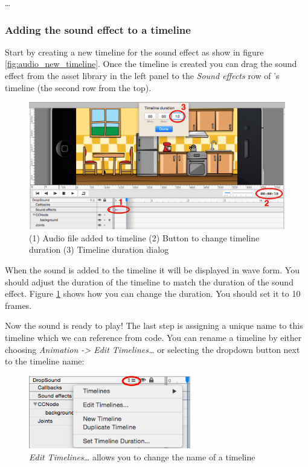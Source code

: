 \ldots


\subsubsection{Adding the sound effect to a timeline}

Start by creating a new timeline for the sound effect as show in figure
\ref{fig:audio_new_timeline}. Once the timeline is created you can drag the
sound effect from the asset library in the left panel to the \textit{Sound
effects} row of \SB{}'s timeline (the second row from the top).

\begin{figure}[H]
		\centering
		\includegraphics[width=0.9\linewidth]{images/Chapter2/audio_timeline.png}
		\caption{(1) Audio file added to timeline\newline{} (2)
		Button to change timeline duration\newline{} (3) Timeline
		duration dialog\newline{}}\label{fig:change_timeline_duration}
\end{figure}

When the sound is added to the timeline it will be displayed in wave form. You
should adjust the duration of the timeline to match the duration of the sound
effect. Figure \ref{fig:change_timeline_duration} shows how you can change the
duration. You should set it to 10 frames.

Now the sound is ready to play! The last step is assigning a unique name to this
timeline which we can reference from code. You can rename a timeline by either
choosing \textit{Animation -> Edit Timelines\ldots} or selecting the dropdown
button next to the timeline name:

\begin{figure}[H]
		\centering
		\includegraphics[width=200pt]{images/Chapter2/edit_timeline.png}
		\caption{\textit{Edit Timelines\ldots} allows you to change the name of a
		timeline}
\end{figure}

